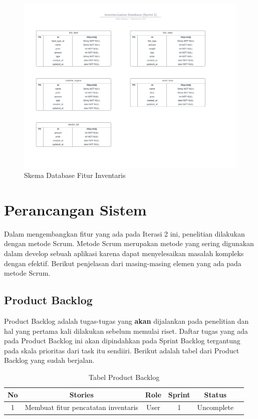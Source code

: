 \begin{figure}[H]
	\centering
	\includegraphics[width=1.2\textwidth]{gambar/akbar/sprint1/sprint1_inventaris_database.png}
	\caption{Skema Database Fitur Inventaris}
\end{figure}

\section{Perancangan Sistem}

Dalam mengembangkan fitur yang ada pada Iterasi 2 ini, penelitian dilakukan dengan metode Scrum. Metode Scrum merupakan metode yang sering digunakan dalam develop sebuah aplikasi karena dapat menyelesaikan masalah kompleks dengan efektif. Berikut penjelasan dari masing-masing elemen yang ada pada metode Scrum.

\subsection{Product Backlog}

Product Backlog adalah tugas-tugas yang \textbf{akan} dijalankan pada penelitian dan hal yang pertama kali dilakukan sebelum memulai riset. Daftar tugas yang ada pada Product Backlog ini akan dipindahkan pada Sprint Backlog tergantung pada skala prioritas dari task itu sendiiri. Berikut adalah tabel dari Product Backlog yang sudah berjalan.

\begin{table}[H]	
	\begin{center}
		\caption{Tabel Product Backlog}
		\label{tab:table5}
		\begin{tabular}{|c|c|c|c|c|c|}
		\hline
		\textbf{No} & \textbf{Stories} & \textbf{Role} & \textbf{Sprint} & \textbf{Status} \\
		\hline
		1 & Membuat fitur pencatatan inventaris & User & 1 & Uncomplete \\
		\hline
		\end{tabular}
	\end{center}
\end{table}


